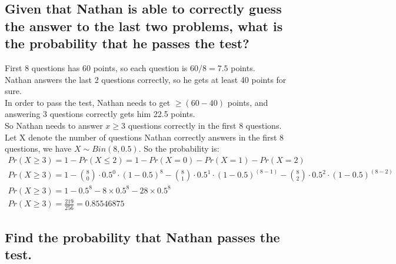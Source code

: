 \documentclass{article}
\begin{document}
\subsection{Given that Nathan is able to correctly guess the answer to the last two problems, what is the probability
that he passes the test?}

First 8 questions has 60 points, so each question is \( 60 / 8 = 7.5 \) points. \\
Nathan answers the last 2 questions correctly, so he gets at least 40 points for sure. \\
In order to pass the test, Nathan needs to get \( \geq (60 - 40) \) points, and answering 3 questions correctly gets him 22.5 points. \\
So Nathan needs to answer \( x \geq 3 \) questions correctly in the first 8 questions. \\
Let X denote the number of questions Nathan correctly answers in the first 8 questions, we have \( X \sim Bin(8, 0.5)\).
So the probability is:
\[
\begin{array}{ll}
Pr(X \geq 3) = 1 - Pr(X \leq 2) = 1 - Pr(X=0) - Pr(X=1) - Pr(X=2) \\
Pr(X \geq 3) = 1 - {8 \choose 0} \cdot 0.5^0 \cdot (1-0.5)^8 - {8 \choose 1} \cdot 0.5^1 \cdot (1-0.5)^{(8-1)} - {8 \choose 2} \cdot 0.5^2 \cdot (1-0.5)^{(8-2)} \\
Pr(X \geq 3) = 1 - 0.5^8 - 8 \times 0.5^8 - 28 \times 0.5^8 \\
Pr(X \geq 3) = \frac{219}{256} = 0.85546875
\end{array}
\]

\subsection{Find the probability that Nathan passes the test.}
\end{document}
